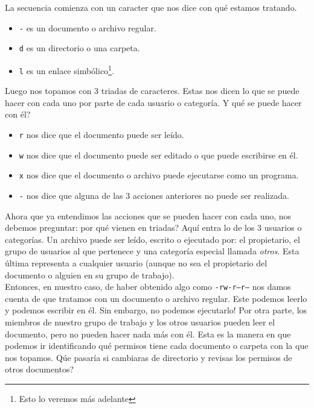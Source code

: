 \documentclass[10pt,letterpaper]{article}
\newcommand{\inlinecode}[1]{
\colorbox{light-gray}{\texttt{#1}}
}
\begin{document}
La secuencia comienza con un caracter que nos dice con qu\'e estamos tratando.
\begin{itemize}
\item \inlinecode{-} es un documento o archivo regular.
\item \inlinecode{d} es un directorio o una carpeta.
\item \inlinecode{l} es un enlace simb\'olico\footnote{Esto lo veremos m\'as adelante}.
\end{itemize}

Luego nos topamos con 3 triadas de caracteres. Estas nos dicen lo que se puede hacer con cada uno por parte de cada usuario o categor\'ia. Y qu\'e se puede hacer con \'el?
\begin{itemize}
\item \inlinecode{r} nos dice que el documento puede ser le\'ido.
\item \inlinecode{w} nos dice que el documento puede ser editado o que puede escribirse en \'el.
\item \inlinecode{x} nos dice que el documento o archivo puede ejecutarse como un programa.
\item \inlinecode{-} nos dice que alguna de las 3 acciones anteriores no puede ser realizada.
\end{itemize}

Ahora que ya entendimos las acciones que se pueden hacer con cada uno, nos debemos preguntar: por qu\'e vienen en triadas? Aqu\'i entra lo de los 3 usuarios o categor\'ias. Un archivo puede ser le\'ido, escrito o ejecutado por: el propietario, el grupo de usuarios al que pertenece y una categor\'ia especial llamada \emph{otros}. Esta \'ultima representa a cualquier usuario (aunque no sea el propietario del documento o alguien en su grupo de trabajo).\\

Entonces, en nuestro caso, de haber obtenido algo como \inlinecode{-rw-r--r--} nos damos cuenta de que tratamos con un documento o archivo regular. Este podemos leerlo y podemos escribir en \'el. Sin embargo, no podemos ejecutarlo! Por otra parte, los miembros de nuestro grupo de trabajo y los otros usuarios pueden leer el documento, pero no pueden hacer nada m\'as con \'el. Esta es la manera en que podemos ir identificando qu\'e permisos tiene cada documento o carpeta con la que nos topamos. Q\'ue pasar\'ia si cambiaras de directorio y revisas los permisos de otros documentos?\\
\end{document}
